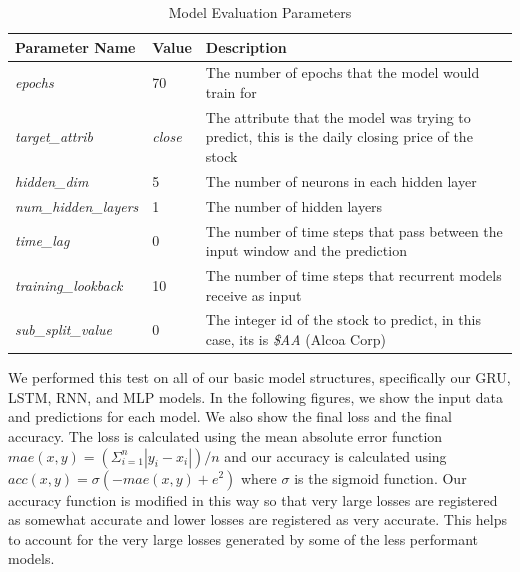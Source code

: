 \documentclass{ledger}
\begin{document}
\begin{table}[H]
    \begin{center}
        \caption{{Model Evaluation Parameters}}
        \label{tab:evalParams}
        \bgroup
        \def\arraystretch{1.2}
        \begin{tabular}{|p{4cm}|p{1cm}|p{8cm}|}
            \hline
            \textbf{Parameter Name} & \textbf{Value} & \textbf{Description}\\
            \hline
            \textit{epochs} & 70 & The number of epochs that the model would train for\\
            \hline
            \textit{target\_attrib} & \textit{close} & The attribute that the model was trying to predict, this is the daily closing price of the stock\\
            \hline
            \textit{hidden\_dim} & 5 & The number of neurons in each hidden layer\\
            \hline
            \textit{num\_hidden\_layers} & 1 & The number of hidden layers\\
            \hline
            \textit{time\_lag} & 0 & The number of time steps that pass between the input window and the prediction\\
            \hline
            \textit{training\_lookback} & 10 & The number of time steps that recurrent models receive as input\\
            \hline
            \textit{sub\_split\_value} & 0 & The integer id of the stock to predict, in this case, its is \textit{\$AA} (Alcoa Corp)\\
            \hline
        \end{tabular}
        \egroup
    \end{center}
\end{table}

We performed this test on all of our basic model structures, specifically our GRU, LSTM, RNN, and MLP models. In the following
figures, we show the input data and predictions for each model.  We also show the final loss and the final accuracy.
The loss is calculated using the mean absolute error function
$mae(x, y) = (\Sigma^n_{i=1} |y_i - x_i|) / n$ and our accuracy is calculated using
$acc(x, y) = \sigma(-mae(x, y)+e^2)$ where $\sigma$ is the sigmoid function.
Our accuracy function is modified in this way so that very large losses are registered as somewhat accurate and lower
losses are registered as very accurate.  This helps to account for the very large losses generated by some of the less
performant models.
\end{document}
